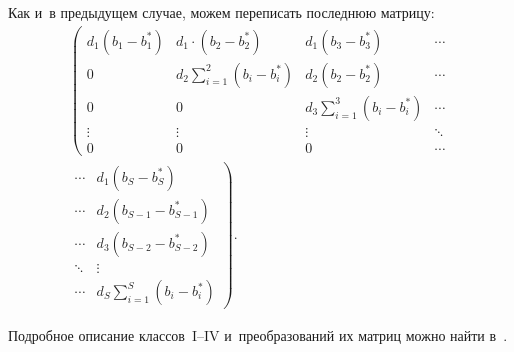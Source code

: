 \begin{multicols}{2}
\noindent 
Как и~в предыдущем случае, можем переписать последнюю матрицу:
\begin{multline*}
\left(
\begin{array}{cccc}
d_1\left( b_1-b_1^*\right)     & d_1\cdot\left( b_2-b_2^*\right)                 
& d_1\left( b_3-b_3^*\right)             & \cdots \\
0                                   & d_2\displaystyle\sum\limits_{i=1}^{2} \left(  b_{i} - 
b_{i}^*\right)          & d_2\left( b_2-b_2^*\right)             & \cdots\\
0                                   & 0                                               
& d_3\displaystyle\sum\limits_{i=1}^{3} \left(  b_{i} - b_{i}^*\right)      & \cdots \\
\vdots                              & \vdots                                          
& \vdots                                      & \ddots \\
0                                   & 0                                               
& 0            & \cdots
 \end{array}
\right.\\
\left.
\begin{array}{cc}
\cdots & d_1\left( b_S-b_S^*\right)\\
\cdots & d_2\left( b_{S-1}-b_{S-1}^*\right)\\
 \cdots & d_3\left( b_{S-2}-b_{S-2}^*\right)\\
\ddots & \vdots\\
\cdots & d_S\displaystyle\sum\limits_{i=1}^{S} \left(  b_{i} - b_{i}^*\right)
 \end{array}
\right).
\end{multline*}

Подробное описание классов~I--IV и~преобразований их матриц можно найти в~\cite{Zeifman}.

\begin{figure*}[b] %
\vspace*{8pt}
  \begin{center}  
    \mbox{%
\epsfxsize=163mm
}
\end{center}
\vspace*{-12pt}
\vspace*{3pt}
  \begin{center}  
    \mbox{%
\epsfxsize=163mm
}
\end{center}
\vspace*{-12pt}
\end{figure*}


\end{multicols}
